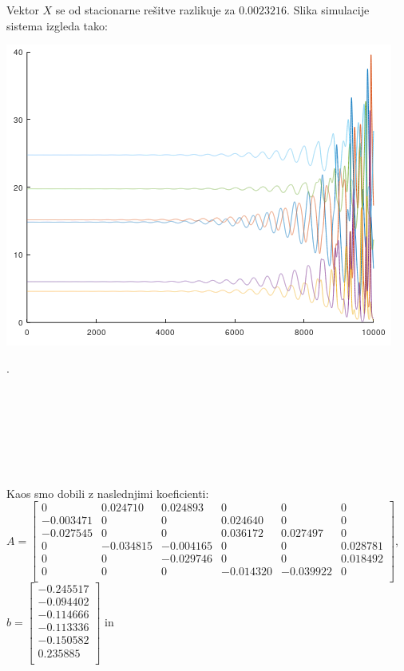 \documentclass[a4paper, 12pt]{article}
\begin{document}
Vektor $ X $ se od stacionarne rešitve razlikuje za $ 0.0023216 $. Slika simulacije
sistema izgleda tako:
\begin{center}
	\includegraphics{asimptotic_cyclic_source.png}
\end{center}
.
\\
\\
\\
\\
\\
\\
\\
\\
Kaos smo dobili z naslednjimi koeficienti:\\
$ A =
\begin{bmatrix}
	0 & 0.024710 & 0.024893 & 0 & 0 & 0 \\
	-0.003471 & 0 & 0 & 0.024640 & 0 & 0 \\
	-0.027545 & 0 & 0 & 0.036172 & 0.027497 & 0 \\
	0 & -0.034815 & -0.004165 & 0 & 0 & 0.028781 \\
	0 & 0 & -0.029746 & 0 & 0 & 0.018492 \\
	0 & 0 & 0 & -0.014320 & -0.039922 & 0 \\
\end{bmatrix} $, 
$ b =
\begin{bmatrix}
	-0.245517 \\
	-0.094402 \\
	-0.114666 \\
	-0.113336 \\
	-0.150582 \\
	0.235885 \\
\end{bmatrix} $ in
\end{document}
